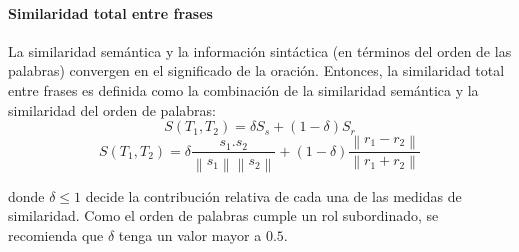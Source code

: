 \paragraph{Similaridad total entre frases}
La similaridad semántica y la información sintáctica (en términos del orden de las palabras) convergen en el significado de la oración. Entonces, la similaridad total entre frases es definida como la combinación de la similaridad semántica y la similaridad del orden de palabras:
\[S(T_1, T_2)=\delta S_s + (1 - \delta)S_r\]
\[S(T_1, T_2)=\delta \frac{s_1.s_2}{\left \| s_1 \right \|\left \| s_2 \right \|} + (1 - \delta)\frac{\left \|r_1-r_2 \right \|}{\left \| r_1+r_2 \right \|}\]

\bigskip donde \(\delta \leq 1\) decide la contribución relativa de cada una de las medidas de similaridad. Como el orden de palabras cumple un rol subordinado, se recomienda que \(\delta\) tenga un valor mayor a \(0.5\).

